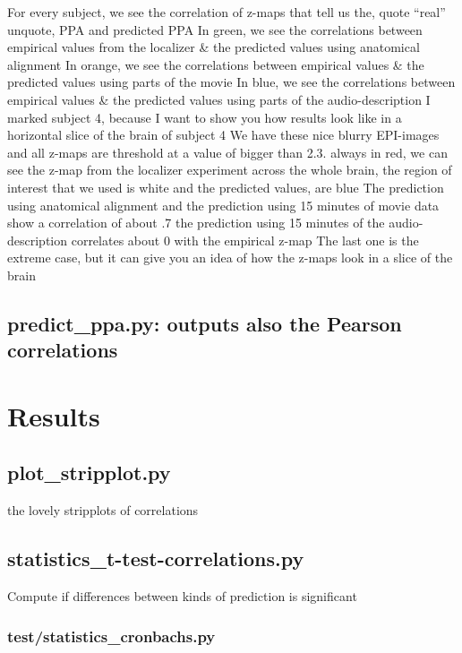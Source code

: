 %
For every subject, we see the correlation of z-maps that tell us the, quote
``real'' unquote, PPA and predicted PPA
%
In green, we see the correlations between empirical values from the localizer \&
the predicted values using anatomical alignment
%
In orange, we see the correlations between empirical values \& the predicted
values using parts of the movie
%
In blue, we see the correlations between empirical values \& the predicted
values using parts of the audio-description
%
I marked subject 4, because I want to show you how results look like in a
horizontal slice of the brain of subject 4
%
We have these nice blurry EPI-images and all z-maps are threshold at a value of
bigger than 2.3.
%
always in red, we can see the z-map from the localizer experiment across the
whole brain,
%
the region of interest that we used is white and the predicted values, are blue
%
The prediction using anatomical alignment and the prediction using 15 minutes of
movie data show a correlation of about .7
%
the prediction using 15 minutes of the audio-description correlates about 0 with
the empirical z-map
%
The last one is the extreme case, but it can give you an idea of how the z-maps
look in a slice of the brain


\subsection{predict\_ppa.py: outputs also the Pearson correlations}


\section{Results}



\subsection{plot\_stripplot.py}

the lovely stripplots of correlations

\subsection{statistics\_t-test-correlations.py}

Compute if differences between kinds of prediction is significant


\subsubsection{test/statistics\_cronbachs.py}

